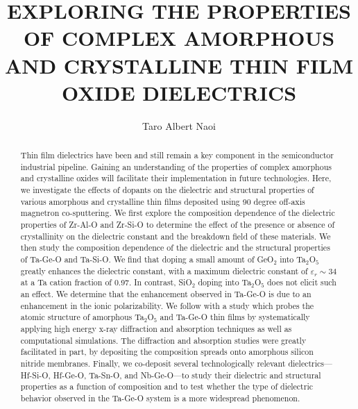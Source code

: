 \documentclass[phd,tocprelim,cornellheadings,final,]{cornell}
\title {EXPLORING THE PROPERTIES OF COMPLEX AMORPHOUS AND CRYSTALLINE THIN FILM OXIDE DIELECTRICS}
\author {Taro Albert Naoi}
\begin{document}
\maketitle
\makecopyright

\begin{abstract}
Thin film dielectrics have been and still remain a key component in the semiconductor industrial pipeline. Gaining an understanding of the properties  of complex amorphous and crystalline oxides will facilitate their implementation in future technologies. Here, we investigate the effects of dopants on the dielectric and structural properties of various amorphous and crystalline thin films deposited using 90 degree off-axis magnetron co-sputtering. We first explore the composition dependence of the dielectric properties of Zr-Al-O and Zr-Si-O to determine the effect of the presence or absence of crystallinity on the dielectric constant and the breakdown field of these materials. We then study the composition dependence of the dielectric and the structural properties of Ta-Ge-O and Ta-Si-O. We find that doping a small amount of GeO$_{2}$ into Ta$_{2}$O$_{5}$ greatly enhances the dielectric constant, with a maximum dielectric constant of $\varepsilon_{r} \sim 34$ at a Ta cation fraction of 0.97. In contrast, SiO$_{2}$ doping into Ta$_{2}$O$_{5}$ does not elicit such an effect. We determine that the enhancement observed in Ta-Ge-O is due to an enhancement in the ionic polarizability. We follow with a study which probes the atomic structure of amorphous Ta$_{2}$O$_{5}$ and Ta-Ge-O thin films by systematically applying high energy x-ray diffraction and absorption techniques as well as computational simulations. The diffraction and absorption studies were greatly facilitated in part, by depositing the composition spreads onto amorphous silicon nitride membranes.  Finally, we co-deposit several technologically relevant dielectrics---Hf-Si-O, Hf-Ge-O, Ta-Sn-O, and Nb-Ge-O---to study their dielectric and structural properties as a function of composition and to test whether the type of dielectric behavior observed in the Ta-Ge-O system is a more widespread phenomenon. 
\end{abstract}
\end{document}
